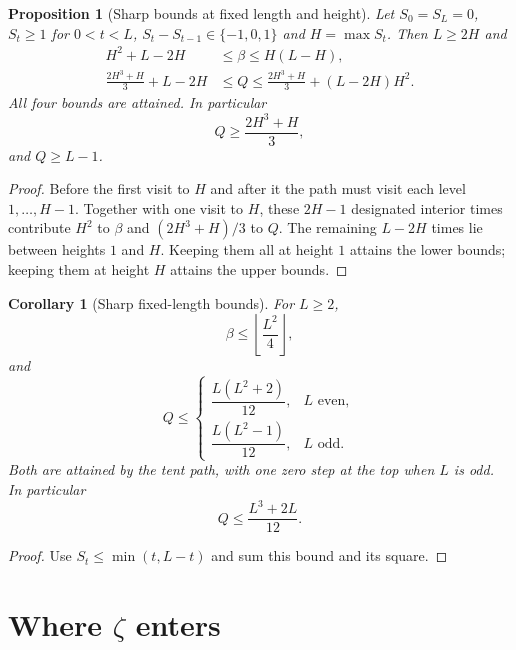 \documentclass[11pt]{amsart}
\numberwithin{equation}{section}
\theoremstyle{plain}
\newtheorem{proposition}[theorem]{Proposition}
\newtheorem{corollary}[theorem]{Corollary}
\theoremstyle{definition}
\theoremstyle{remark}
\begin{document}
\begin{proposition}[Sharp bounds at fixed length and height]
\label{prop:sharp-LH}\label{rem:height-Q}
Let $S_0=S_L=0$, $S_t\ge1$ for $0<t<L$,
$S_t-S_{t-1}\in\{-1,0,1\}$ and $H=\max S_t$. Then $L\ge2H$ and
\begin{align}
H^2+L-2H&\le\beta\le H(L-H),\label{eq:beta-LH}\\
\frac{2H^3+H}{3}+L-2H&\le Q\le
\frac{2H^3+H}{3}+(L-2H)H^2.\label{eq:Q-LH}
\end{align}
All four bounds are attained. In particular
\begin{equation}
\label{eq:height_Q_min}
Q\ge\frac{2H^3+H}{3},
\end{equation}
and $Q\ge L-1$.
\end{proposition}

\begin{proof}
Before the first visit to $H$ and after it the path must visit each level
$1,\dots,H-1$.  Together with one visit to $H$, these $2H-1$ designated
interior times contribute $H^2$ to $\beta$ and $(2H^3+H)/3$ to $Q$.
The remaining $L-2H$ times lie between heights $1$ and $H$. Keeping them all
at height $1$ attains the lower bounds; keeping them at height $H$ attains
the upper bounds.
\end{proof}

\begin{corollary}[Sharp fixed-length bounds]
\label{cor:fixed-L}
For $L\ge2$,
\[
\beta\le\left\lfloor\frac{L^2}{4}\right\rfloor,
\]
and
\[
Q\le
\begin{cases}
\dfrac{L(L^2+2)}{12},&L\text{ even},\\[1ex]
\dfrac{L(L^2-1)}{12},&L\text{ odd}.
\end{cases}
\]
Both are attained by the tent path, with one zero step at the top when $L$
is odd. In particular
\begin{equation}
\label{eq:Q_upper}
Q\le\frac{L^3+2L}{12}.
\end{equation}
\end{corollary}

\begin{proof}
Use $S_t\le\min(t,L-t)$ and sum this bound and its square.
\end{proof}

\section{Where \texorpdfstring{$\zeta$}{zeta} enters}
\label{sec:zeta}
\end{document}
